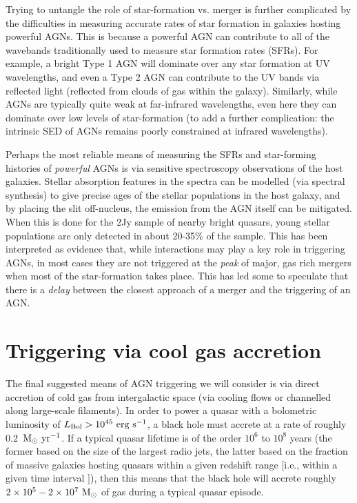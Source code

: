 \documentclass[11pt]{article}
\begin{document}
Trying to untangle the role of star-formation vs. merger is further
complicated by the difficulties in measuring accurate rates of star
formation in galaxies hosting powerful AGNs. This is because a
powerful AGN can contribute to all of the wavebands traditionally used
to measure star formation rates (SFRs). For example, a bright Type 1
AGN will dominate over any star formation at UV wavelengths, and even
a Type 2 AGN can contribute to the UV bands via reflected light
(reflected from clouds of gas within the galaxy). Similarly, while
AGNs are typically quite weak at far-infrared wavelengths, even here
they can dominate over low levels of star-formation (to add a further
complication: the intrinsic SED of AGNs remains poorly constrained at
infrared wavelengths).

Perhaps the most reliable means of measuring the SFRs and star-forming
histories of {\it powerful} AGNs is via sensitive spectroscopy
observations of the host galaxies. Stellar absorption features in the
spectra can be modelled (via spectral synthesis) to give precise ages
of the stellar populations in the host galaxy, and by placing the slit
off-nucleus, the emission from the AGN itself can be mitigated. When
this is done for the 2Jy sample of nearby bright quasars, young
stellar populations are only detected in about 20-35\% of the
sample. This has been interpreted as evidence that, while interactions
may play a key role in triggering AGNs, in most cases they are not
triggered at the {\it peak} of major, gas rich mergers when most of
the star-formation takes place. This has led some to speculate that
there is a {\it delay} between the closest approach of a merger and
the triggering of an AGN.

\section{Triggering via cool gas accretion}
The final suggested means of AGN triggering we will consider is via
direct accretion of cold gas from intergalactic space (via cooling
flows or channelled along large-scale filaments). In order to power a
quasar with a bolometric luminosity of
$L_{\rm Bol}>10^{45}~{\rm erg~s^{-1}}$, a black hole must accrete at a
rate of roughly 0.2~${\rm M_\odot~yr^{-1}}$. If a typical quasar
lifetime is of the order $10^6$ to $10^8$ years (the former based on
the size of the largest radio jets, the latter based on the fraction
of massive galaxies hosting quasars within a given redshift range
$[$i.e., within a given time interval $]$), then this means that the
black hole will accrete roughly
$2\times10^{5}-2\times10^{7}~{\rm M_\odot}$ of gas during a typical
quasar episode.
\end{document}
